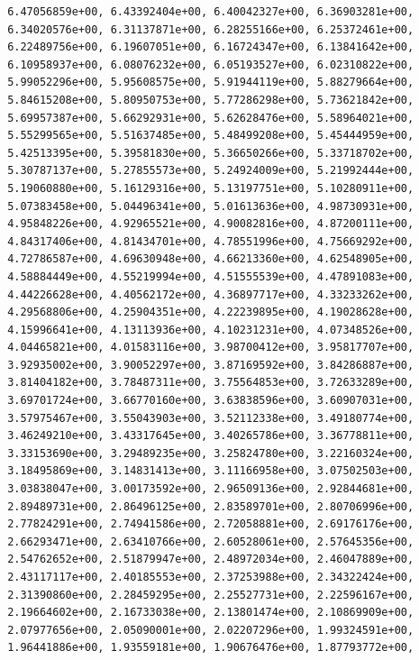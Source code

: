 \documentclass[
  letterpaper,
]{scrreprt}
\begin{document}
\begin{verbatim}
       6.47056859e+00, 6.43392404e+00, 6.40042327e+00, 6.36903281e+00,
       6.34020576e+00, 6.31137871e+00, 6.28255166e+00, 6.25372461e+00,
       6.22489756e+00, 6.19607051e+00, 6.16724347e+00, 6.13841642e+00,
       6.10958937e+00, 6.08076232e+00, 6.05193527e+00, 6.02310822e+00,
       5.99052296e+00, 5.95608575e+00, 5.91944119e+00, 5.88279664e+00,
       5.84615208e+00, 5.80950753e+00, 5.77286298e+00, 5.73621842e+00,
       5.69957387e+00, 5.66292931e+00, 5.62628476e+00, 5.58964021e+00,
       5.55299565e+00, 5.51637485e+00, 5.48499208e+00, 5.45444959e+00,
       5.42513395e+00, 5.39581830e+00, 5.36650266e+00, 5.33718702e+00,
       5.30787137e+00, 5.27855573e+00, 5.24924009e+00, 5.21992444e+00,
       5.19060880e+00, 5.16129316e+00, 5.13197751e+00, 5.10280911e+00,
       5.07383458e+00, 5.04496341e+00, 5.01613636e+00, 4.98730931e+00,
       4.95848226e+00, 4.92965521e+00, 4.90082816e+00, 4.87200111e+00,
       4.84317406e+00, 4.81434701e+00, 4.78551996e+00, 4.75669292e+00,
       4.72786587e+00, 4.69630948e+00, 4.66213360e+00, 4.62548905e+00,
       4.58884449e+00, 4.55219994e+00, 4.51555539e+00, 4.47891083e+00,
       4.44226628e+00, 4.40562172e+00, 4.36897717e+00, 4.33233262e+00,
       4.29568806e+00, 4.25904351e+00, 4.22239895e+00, 4.19028628e+00,
       4.15996641e+00, 4.13113936e+00, 4.10231231e+00, 4.07348526e+00,
       4.04465821e+00, 4.01583116e+00, 3.98700412e+00, 3.95817707e+00,
       3.92935002e+00, 3.90052297e+00, 3.87169592e+00, 3.84286887e+00,
       3.81404182e+00, 3.78487311e+00, 3.75564853e+00, 3.72633289e+00,
       3.69701724e+00, 3.66770160e+00, 3.63838596e+00, 3.60907031e+00,
       3.57975467e+00, 3.55043903e+00, 3.52112338e+00, 3.49180774e+00,
       3.46249210e+00, 3.43317645e+00, 3.40265786e+00, 3.36778811e+00,
       3.33153690e+00, 3.29489235e+00, 3.25824780e+00, 3.22160324e+00,
       3.18495869e+00, 3.14831413e+00, 3.11166958e+00, 3.07502503e+00,
       3.03838047e+00, 3.00173592e+00, 2.96509136e+00, 2.92844681e+00,
       2.89489731e+00, 2.86496125e+00, 2.83589701e+00, 2.80706996e+00,
       2.77824291e+00, 2.74941586e+00, 2.72058881e+00, 2.69176176e+00,
       2.66293471e+00, 2.63410766e+00, 2.60528061e+00, 2.57645356e+00,
       2.54762652e+00, 2.51879947e+00, 2.48972034e+00, 2.46047889e+00,
       2.43117117e+00, 2.40185553e+00, 2.37253988e+00, 2.34322424e+00,
       2.31390860e+00, 2.28459295e+00, 2.25527731e+00, 2.22596167e+00,
       2.19664602e+00, 2.16733038e+00, 2.13801474e+00, 2.10869909e+00,
       2.07977656e+00, 2.05090001e+00, 2.02207296e+00, 1.99324591e+00,
       1.96441886e+00, 1.93559181e+00, 1.90676476e+00, 1.87793772e+00,

\end{verbatim}
\end{document}
